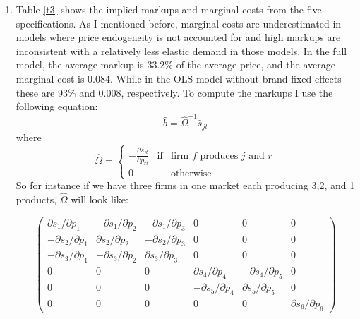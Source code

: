 \documentclass[12pt,english]{article}
\begin{document}
\begin{enumerate}
\item Table \eqref{t3} shows the implied markups and marginal costs from the five specifications. As I mentioned before, marginal costs are underestimated in models where price endogeneity is not accounted for and high markups are inconsistent with a relatively less elastic demand in those models. In the full model, the average markup is 33.2\% of the average price, and the average marginal cost is 0.084. While in the OLS model without brand fixed effects these are 93\% and 0.008, respectively. To compute the markups I use the following equation:
\[
\hat{b}=\hat{\Omega}^{-1}\hat{s}_{jt}
\]
where 
\[
\hat{\Omega}=\left\{\begin{array}{ccc}
-\frac{\partial s_{jt}}{\partial p_{rt}} & \mbox{if} & \mbox{firm $f$ produces $j$ and $r$}\\
0 & & \mbox{otherwise}
\end{array}\right.
\]
So for instance if we have three firms in one market each producing 3,2, and 1 products, $\hat{\Omega}$ will look like:

\[
\left(\begin{array}{cccccc} 
\partial s_{1}/\partial p_{1} & -\partial s_{1}/\partial p_{2} &-\partial s_{1}/\partial p_{3} & 0&0&0\\
-\partial s_{2}/\partial p_{1} & \partial s_{2}/\partial p_{2} &-\partial s_{2}/\partial p_{3} & 0&0&0\\
-\partial s_{3}/\partial p_{1} & -\partial s_{3}/\partial p_{2} &\partial s_{3}/\partial p_{3} & 0&0&0\\
0&0&0&\partial s_{4}/\partial p_{4}&-\partial s_{4}/\partial p_{5} & 0\\
0&0&0&-\partial s_{5}/\partial p_{4}&\partial s_{5}/\partial p_{5} & 0\\
0&0&0&0&0&\partial s_{6}/\partial p_{6}
\end{array}\right)
\]


\end{enumerate}
\end{document}
